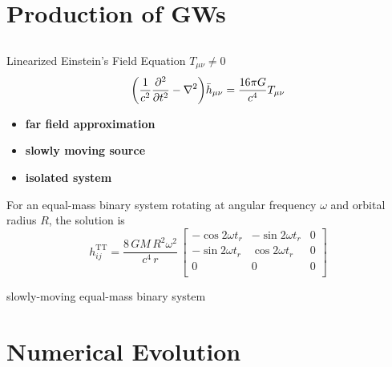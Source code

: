 \documentclass{beamer}
\theoremstyle{definition}
\theoremstyle{plain}
\begin{document}
\section{Production of GWs}
\subsection{}
\begin{frame}{Linearized Einstein's Field Equation $T_{\mu \nu} \neq  0$}
\[
\qty(
\dfrac{1}{c^{2}}
\pdv[2]{}{t}
-
\nabla ^{2}
)
\bar{h} _{\mu \nu} =\dfrac{16 \pi G}{c^{4}} T_{\mu \nu}
\]

\begin{itemize}
\item \textbf{far field approximation}%
\item \textbf{slowly moving source}%

\item \textbf{isolated system}%

\end{itemize}
For an equal-mass binary system rotating at angular frequency $\omega$ and orbital radius $R$, the solution is
\[
h^{\text{TT}} _{ij} = \frac{8\,G M \,R^{2} \omega^{2}}{c^{4}\, r} \,
\begin{bmatrix}
- \cos 2 \omega t_r   &
 - \sin 2 \omega t_r &
0
\\
  -\sin 2 \omega t_r &
 \cos 2 \omega t_r &
0
\\
0 & 0 & 0\\
\end{bmatrix}
\]
\end{frame}



\begin{frame}{slowly-moving equal-mass binary system}
\begin{figure}
    \centering
    \end{figure}
\end{frame}


\section{Numerical Evolution}
\end{document}
